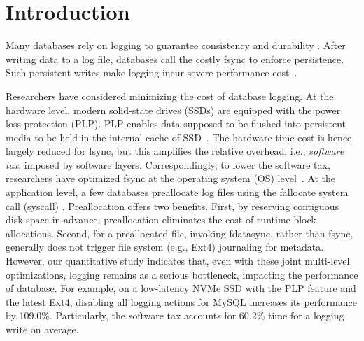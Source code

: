 \section{Introduction}\label{sec:intro_background}

Many databases rely on logging to guarantee  consistency and durability 
\cite{DB:OceanBase:VLDB-2022,mysql2013mysql}. %
After writing data  to a log file, databases call the costly fsync  to enforce persistence.
Such persistent writes make logging incur severe performance cost~\cite{lee2015waldio}. %

Researchers have considered  minimizing the cost of database logging.
At the hardware level, modern solid-state drives (SSDs) are equipped with the power loss protection (PLP). 
PLP enables data supposed to be flushed into persistent media to be
held in the internal cache of SSD~\cite{SSD:PLP:TC-2016,PLP:samsung}.
The hardware time cost  is hence largely reduced for fsync, but 
this  amplifies the relative overhead, i.e., {\em software tax}, imposed by    software layers. %
Correspondingly,
to lower the software tax,
researchers
have optimized fsync  at the operating system (OS) %
 level~\cite{fsync:rethink:OSDI-2006,fsync:OptFS:SOSP-2013,fsync:FastCommit:ATC-2024,fsync:iJournaling:ATC-2017,fsync:RFLUSH:FAST-2018}.
At the application level, a few databases
  preallocate log files using the fallocate system call (syscall) \cite{DB:OceanBase:VLDB-2022,mysql2013mysql}.
 Preallocation offers two   benefits. First, by reserving contiguous disk space in advance, %
 preallocation
 eliminates the   cost 
of runtime block  allocations.
Second, for a preallocated file, invoking fdatasync, rather than fsync, generally does not trigger file system (e.g., Ext4) journaling for metadata.
However, our quantitative study indicates that, even with these joint multi-level optimizations,
logging remains as a serious bottleneck, impacting the performance of database. 
For example, on a low-latency NVMe SSD  with the PLP feature and the latest Ext4,
 disabling all logging actions for MySQL  \cite{mysql2013mysql}
increases its performance by 109.0\%.
Particularly,
the software tax accounts for 60.2\% time for a logging write on average. %

